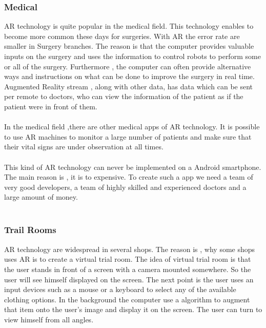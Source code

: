  \subsubsection{Medical}
 AR technology is quite popular in the medical field.  This technology enables to become more common these days for surgeries.  With AR the error rate are smaller in Surgery branches. The reason is that the computer provides valuable inputs on the surgery and uses the information to control robots to perform some or all of the surgery.  Furthermore , the computer  can often provide alternative ways and instructions  on what can be done to improve the  surgery in real time.   Augmented Reality  stream , along with other data, has data which can be sent per remote to doctors, who can view the information of the patient as  if the patient were in front of them.
 \\
 \\
 In the medical field ,there are other medical apps of AR technology.  It is possible to use AR machines to monitor a large number of patients and make sure that their vital signs are under observation at all times.
 \\
 \\
 This kind of AR technology can never be implemented on a Android smartphone. The main reason is , it is to expensive.  To create such a app we need a team of very good developers, a team of highly skilled and experienced doctors and a large amount of money.\cite{AugmentedBook}
 \\
 \\
 \subsubsection{Trail Rooms}
 AR technology are widespread in several shops. The reason is , why some shops uses AR is to create a virtual trial room.  The idea of virtual trial room is  that the user stands in front of a screen with a camera mounted somewhere.  So the user will see himself displayed on the screen. The next point is the user uses an input devices such as a mouse or a keyboard to select any of the available clothing options. In the background the computer use a algorithm to augment that item onto the user's image and display it on the screen.  The  user can turn to view himself from all angles.\cite{AugmentedBook} 
 \\
 \\
